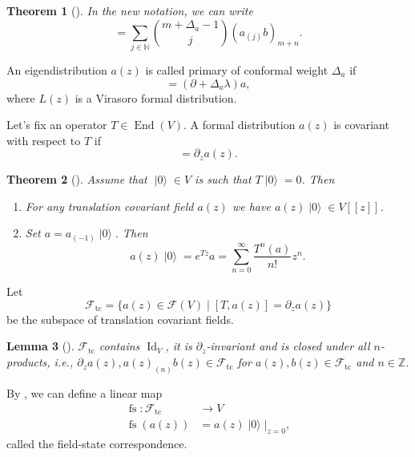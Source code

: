 \documentclass[a4paper, 12pt, reqno]{amsart}
\newtheorem{theorem}{Theorem}[subsection]
\newtheorem{lemma}[theorem]{Lemma}
\theoremstyle{remark}
\numberwithin{equation}{subsection}
\DeclareMathOperator{\Id}{Id}
\DeclareMathOperator{\End}{End}
\DeclareMathOperator{\vac}{|0\rangle}
\DeclareMathOperator{\fs}{fs}
\DeclareMathOperator{\tc}{tc}
\begin{document}
\begin{theorem}[{\cite[Proposition 3.7.6]{nozaradan_introduction_2008}}]
  \label{thr:9}
  In the new notation, we can write
  \begin{equation*}
    [a_m, b_n] = \sum_{j \in \mathbb{N}}\binom{m + \Delta_a - 1}{j}(a_{(j)}b)_{m + n}.
  \end{equation*}
\end{theorem}

An eigendistribution $a(z)$ is called primary of conformal weight $\Delta_a$ if
\begin{equation*}
  [L_\lambda a]=(\partial +\Delta_a\lambda)a,
\end{equation*}
where $L(z)$ is a Virasoro formal distribution.

Let's fix an operator $T\in \End(V)$.
A formal distribution $a(z)$ is covariant with respect to $T$ if
\begin{equation*}
  [T, a(z)] = \partial_za(z).
\end{equation*}

\begin{theorem}[{\cite[Lemma 1]{callegaro_introduction_2017}}]
  \label{thr:10}
  Assume that $\vac \in V$ is such that $T\vac = 0$.
  Then
  \begin{enumerate}
  \item For any translation covariant field $a(z)$ we have $a(z)\vac \in V[[z]]$.
  \item Set $a = a_{(-1)}\vac$.
    Then
    \begin{equation*}
      a(z)\vac = e^{Tz}a = \sum_{n = 0}^\infty\frac{T^n(a)}{n!}z^n.
    \end{equation*}
  \end{enumerate}
\end{theorem}

Let
\begin{equation*}
  \mathcal{F}_{\tc} = \{a(z) \in \mathcal{F}(V) \mid [T, a(z)] = \partial_za(z)\}
\end{equation*}
be the subspace of translation covariant fields.

\begin{lemma}[{\cite[Lemma 3]{callegaro_introduction_2017}}]
  \label{lmm:3}
  $\mathcal{F}_{\tc}$ contains $\Id_V$, it is $\partial_z$-invariant and is closed under all $n$-products, i.e., $\partial_za(z), a(z)_{(n)}b(z) \in \mathcal{F}_{\tc}$ for $a(z), b(z) \in \mathcal{F}_{\tc}$ and $n \in \mathbb{Z}$.
\end{lemma}

By , we can define a linear map
\begin{align*}
  \fs: \mathcal{F}_{\tc} &\to V \\
  \fs(a(z)) &= a(z)\vac|_{z = 0},
\end{align*}
called the field-state correspondence.
\end{document}
